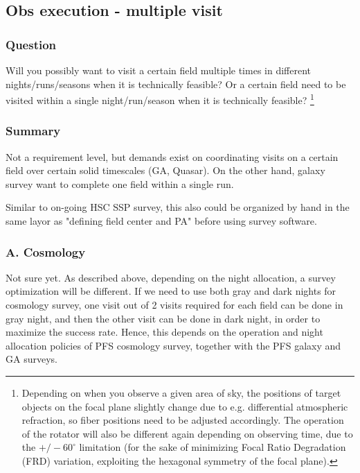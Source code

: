 \documentclass[a4paper,notitlepage]{article}
\begin{document}
\subsection{Obs execution - multiple visit}

\subsubsection{Question}
Will you possibly want to visit a certain field
           multiple times in different nights/runs/seasons when it
           is technically feasible?
           Or a certain field need to be visited within a single 
           night/run/season when it is technically feasible? 
           \footnote{Depending on when you
           observe a given area of sky, the positions of target
           objects on the focal plane slightly change due to
           e.g. differential atmospheric refraction, so fiber
           positions need to be adjusted accordingly. The operation
           of the rotator will also be different again depending on
           observing time, due to the $+/-60^{\circ}$ limitation
           (for the sake of minimizing Focal Ratio Degradation (FRD)
           variation, exploiting the hexagonal symmetry of the focal
           plane).}

\subsubsection{Summary}

Not a requirement level, but demands exist on coordinating visits on a certain 
field over certain solid timescales (GA, Quasar). 
On the other hand, galaxy survey want to complete one field within a single run. 

Similar to on-going HSC SSP survey, this also could be organized by hand in 
the same layor as "defining field center and PA" before using survey software. 


\subsubsection{A. Cosmology}
Not sure yet. As described above, depending on the night
allocation, a survey optimization will be different. If we need to use
both gray and dark nights for cosmology survey, one visit out of 2
visits required for each field can be done in gray night, and then the
other visit can be done in dark night, in order to maximize the
success rate. Hence, this depends on the operation and night
allocation policies of PFS cosmology survey, together with the PFS
galaxy and GA surveys.
\end{document}
